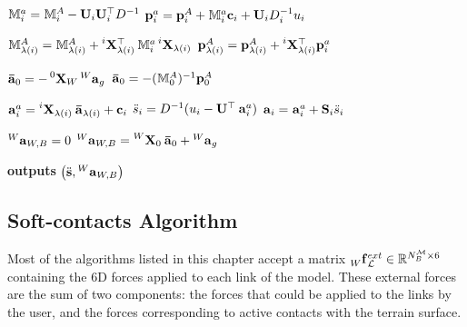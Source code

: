 \begin{algorithm}
\begin{algorithmic}[1]
    \State $\masssix_i^a = \masssix_i^A - \mathbf{U}_i \mathbf{U}_i^\top D^{-1}$
    \State $\mathbf{p}_i^a = \mathbf{p}_i^A + \masssix_i^a \mathbf{c}_i + \mathbf{U}_i D_i^{-1} u_i$
    
        \State $\masssix_{\lambda(i)}^A = \masssix_{\lambda(i)}^A + \transvel[i]_{\lambda(i)}^\top \masssix_i^a \transvel[i]_{\lambda(i)}$
        \State $\mathbf{p}_{\lambda(i)}^A = \mathbf{p}_{\lambda(i)}^A + \transvel[i]_{\lambda(i)}^\top \mathbf{p}_i^a$
    \EndIf
\EndFor

    \State $\accsixproper_0 = - \transvel[0]_{W} \accsix[W]_g$
\Else
    \State $\accsixproper_0 = - (\masssix_0^A)^{-1} \mathbf{p}_0^A$
\EndIf

    
    \State $\accsix_i^a = \transvel[i]_{\lambda(i)} \accsixproper_{\lambda(i)} + \mathbf{c}_i$
    \State $\ddot{s}_i = D^{-1}(u_i - \mathbf{U}^\top \accsix_i^a)$
    \State $\accsix_i = \accsix_i^a + \mathbf{S}_i\ddot{s}_i$
\EndFor

\State $\accsix[W]_{W,B} = 0$
    \State $\accsix[W]_{W,B} = \transvel[W]_0 \accsixproper_0 + \accsix[W]_g$
\EndIf

\State \textbf{outputs} $\left( \Shapedd, \accsix[W]_{W,B} \right)$
\end{algorithmic}
\end{algorithm}

\subsection{Soft-contacts Algorithm}
\label{sec:soft_contacts_algorithm}

Most of the algorithms listed in this chapter accept a matrix $\forcesix[W]^{ext}_\mathcal{L} \in \realn^{N_B^\mathcal{M}\times6}$ containing the 6D forces applied to each link of the model.
These external forces are the sum of two components: the forces that could be applied to the links by the user, and the forces corresponding to active contacts with the terrain surface.

